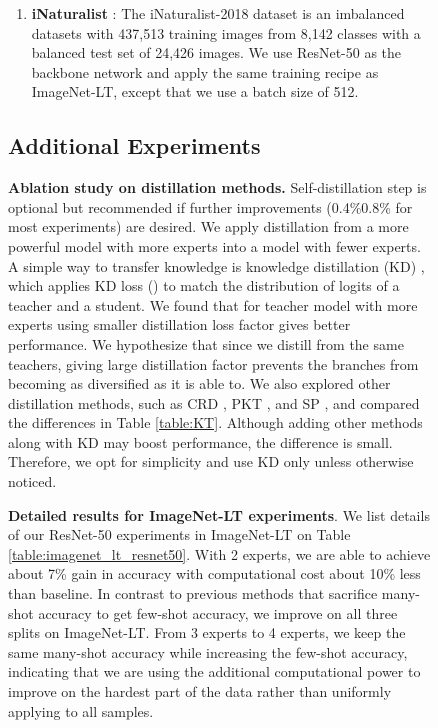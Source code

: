 \documentclass[dvipsnames]{article}
\begin{document}
{\begin{figure}[#1]
\begin{enumerate}[leftmargin=0cm,labelwidth=\itemindent,labelsep=0cm,align=left]
Multiple backbone networks are experimented on ImageNet-LT, including ResNet-10, ResNet-50 and ResNeXt-50 \citep{xie2017aggregated}. All backbone networks are trained with a batch size of 256 on 8 RTX 2080Ti GPUs for 100 epochs using SGD with an initial learning rate of 0.1 decayed by 0.1 at 60 epochs and 80 epochs. We utilize standard data augmentations as in \citep{he2016deep}.

\item {\bf{iNaturalist}} \citep{van2018inaturalist}: The iNaturalist-2018 dataset is an imbalanced datasets with 437,513 training images from 8,142 classes with a balanced test set of 24,426 images. We use ResNet-50 as the backbone network and apply the same training recipe as ImageNet-LT, except that we use a batch size of 512.
\end{enumerate}

\subsection{Additional Experiments}


{\bf{Ablation study on distillation methods.}} 
\label{Knowledge_transfer}
Self-distillation step is optional but recommended if further improvements (0.4\%0.8\% for most experiments) are desired. We apply distillation from a more powerful model with more experts into a model with fewer experts. A simple way to transfer knowledge is knowledge distillation (KD) \citep{hinton2015distilling}, which applies KD loss 
()
to match the distribution of logits of a teacher and a student. We found that for teacher model with more experts using smaller distillation loss factor gives better performance. We hypothesize that since we distill from the same teachers, giving large distillation factor prevents the branches from becoming as diversified as it is able to. We also explored other distillation methods, such as CRD \citep{tian2019contrastive}, PKT \citep{passalis2018learning}, and SP \citep{tung2019similaritypreserving}, and compared the differences in Table \ref{table:KT}. Although adding other methods along with KD may boost performance, the difference is small. Therefore, we opt for simplicity and use KD only unless otherwise noticed.


{\bf{Detailed results for ImageNet-LT experiments}}. 
We list details of our ResNet-50 experiments in ImageNet-LT on Table \ref{table:imagenet_lt_resnet50}. With 2 experts, we are able to achieve about 7\% gain in accuracy with computational cost about 10\% less than baseline. In contrast to previous methods that sacrifice many-shot accuracy to get few-shot accuracy, we improve on all three splits on ImageNet-LT. From 3 experts to 4 experts, we keep the same many-shot accuracy while increasing the few-shot accuracy, indicating that we are using the additional computational power to improve on the hardest part of the data rather than uniformly applying to all samples. 


\end{figure}}
\end{document}
